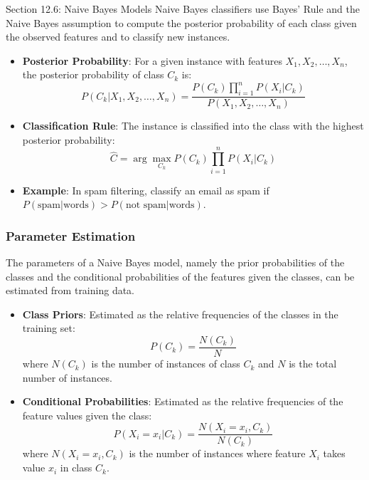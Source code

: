 \begin{notes}{Section 12.6: Naive Bayes Models}
    Naive Bayes classifiers use Bayes' Rule and the Naive Bayes assumption to compute the posterior probability of each class given the observed features and to classify new instances.
    
    \begin{highlight}
    
        \begin{itemize}
            \item \textbf{Posterior Probability}: For a given instance with features $X_1, X_2, \ldots, X_n$, the posterior probability of class $C_k$ is:
            \[
            P(C_k | X_1, X_2, \ldots, X_n) = \frac{P(C_k) \prod_{i=1}^n P(X_i | C_k)}{P(X_1, X_2, \ldots, X_n)}
            \]
            \item \textbf{Classification Rule}: The instance is classified into the class with the highest posterior probability:
            \[
            \hat{C} = \arg\max_{C_k} P(C_k) \prod_{i=1}^n P(X_i | C_k)
            \]
            \item \textbf{Example}: In spam filtering, classify an email as spam if $P(\text{spam} | \text{words}) > P(\text{not spam} | \text{words})$.
        \end{itemize}
    
    \end{highlight}
    
    \subsubsection*{Parameter Estimation}
    
    The parameters of a Naive Bayes model, namely the prior probabilities of the classes and the conditional probabilities of the features given the classes, can be estimated from training data.
    
    \begin{highlight}
    
        \begin{itemize}
            \item \textbf{Class Priors}: Estimated as the relative frequencies of the classes in the training set:
            \[
            P(C_k) = \frac{N(C_k)}{N}
            \]
            where $N(C_k)$ is the number of instances of class $C_k$ and $N$ is the total number of instances.
            \item \textbf{Conditional Probabilities}: Estimated as the relative frequencies of the feature values given the class:
            \[
            P(X_i = x_i | C_k) = \frac{N(X_i = x_i, C_k)}{N(C_k)}
            \]
            where $N(X_i = x_i, C_k)$ is the number of instances where feature $X_i$ takes value $x_i$ in class $C_k$.
        \end{itemize}
    

\end{highlight}
\end{notes}
